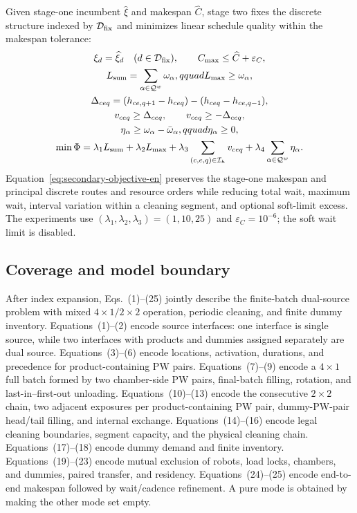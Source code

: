 \documentclass[final,5p,times,twocolumn]{elsarticle}
\begin{document}
Given stage-one incumbent $\widehat\xi$ and makespan $\widehat C$, stage two fixes the discrete structure indexed by $\mathcal D_{\rm fix}$ and minimizes linear schedule quality within the makespan tolerance:
\begin{equation}
\begin{gathered}
\xi_d=\widehat\xi_d\quad(d\in\mathcal D_{\rm fix}),\qquad
C_{\max}\le\widehat C+\varepsilon_C,\\
L_{\rm sum}=\sum_{\alpha\in\mathcal Q^w}\omega_\alpha,qquad
L_{\max}\ge\omega_\alpha,\\
\Delta_{ceq}=(h_{ce,q+1}-h_{ceq})-(h_{ceq}-h_{ce,q-1}),\\
v_{ceq}\ge\Delta_{ceq},\qquad v_{ceq}\ge-\Delta_{ceq},\\
\eta_\alpha\ge\omega_\alpha-\bar\omega_\alpha,qquad
\eta_\alpha\ge0,\\
\min\Phi=\lambda_1L_{\rm sum}+\lambda_2L_{\max}
+\lambda_3\sum_{(c,e,q)\in\mathcal I_h}v_{ceq}
+\lambda_4\sum_{\alpha\in\mathcal Q^w}\eta_\alpha.
\end{gathered}
\label{eq:secondary-objective-en}
\end{equation}
Equation~\eqref{eq:secondary-objective-en} preserves the stage-one makespan and principal discrete routes and resource orders while reducing total wait, maximum wait, interval variation within a cleaning segment, and optional soft-limit excess. The experiments use $(\lambda_1,\lambda_2,\lambda_3)=(1,10,25)$ and $\varepsilon_C=10^{-6}$; the soft wait limit is disabled.

\subsection{Coverage and model boundary}

After index expansion, Eqs.~(1)--(25) jointly describe the finite-batch dual-source problem with mixed $4\times1/2\times2$ operation, periodic cleaning, and finite dummy inventory. Equations~(1)--(2) encode source interfaces: one interface is single source, while two interfaces with products and dummies assigned separately are dual source. Equations~(3)--(6) encode locations, activation, durations, and precedence for product-containing PW pairs. Equations~(7)--(9) encode a $4\times1$ full batch formed by two chamber-side PW pairs, final-batch filling, rotation, and last-in--first-out unloading. Equations~(10)--(13) encode the consecutive $2\times2$ chain, two adjacent exposures per product-containing PW pair, dummy-PW-pair head/tail filling, and internal exchange. Equations~(14)--(16) encode legal cleaning boundaries, segment capacity, and the physical cleaning chain. Equations~(17)--(18) encode dummy demand and finite inventory. Equations~(19)--(23) encode mutual exclusion of robots, load locks, chambers, and dummies, paired transfer, and residency. Equations~(24)--(25) encode end-to-end makespan followed by wait/cadence refinement. A pure mode is obtained by making the other mode set empty.
\end{document}
